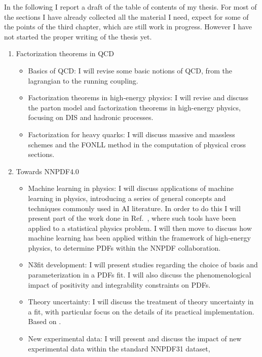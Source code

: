 In the following I report a draft of the table of contents of my thesis.
For most of the sections I have already collected all the material I need, expect for some of the points of the third chapter,
which are still work in progress. However I have not started the proper writing of the thesis yet.

\begin{enumerate}
    \item Factorization theorems in QCD
    \begin{itemize}
        \item Basics of QCD: I will revise some basic notions of QCD, from the lagrangian to the running coupling.
        \item Factorization theorems in high-energy physics: I will revise and discuss the parton model and factorization theorems
        in high-energy physics, focusing on DIS and hadronic processes.
        \item Factorization for heavy quarks: I will discuss massive and massless schemes and the FONLL method in the computation of
        physical cross sections.
    \end{itemize}
    \item Towards NNPDF4.0
    \begin{itemize}
        \item Machine learning in physics: I will discuss applications of machine learning in physics,
        introducing a series of general concepts and techniques commonly used in AI literature.
        In order to do this I will present part of the work done in Ref.~\cite{Cossu:2018pxj}, where such
        tools have been applied to a statistical physics problem.
        I will then move to discuss how machine learning has been applied within the framework
        of high-energy physics, to determine PDFs within the NNPDF collaboration.
        \item N3fit development: I will present studies regarding the choice of basis and parameterization in a PDFs fit.
        I will also discuss the phenomenological impact of positivity and integrability constraints on PDFs.
        \item Theory uncertainty: I will discuss the treatment of theory uncertainty in a fit, with particular focus on the details 
        of its practical implementation. Based on \cite{AbdulKhalek:2019bux, AbdulKhalek:2019ihb}.
        \item New experimental data: I will present and discuss the impact of new experimental data within the standard NNPDF31 dataset,

\end{itemize}
\end{enumerate}
